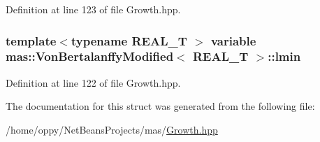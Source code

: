 Definition at line 123 of file Growth.\-hpp.

\hypertarget{structmas_1_1_von_bertalanffy_modified_a2845686ae982422d40b571cb19712cc9}{
\subsubsection[{lmin}]{\setlength{\rightskip}{0pt plus 5cm}template$<$typename R\-E\-A\-L\-\_\-\-T $>$ {\bf variable} {\bf mas\-::\-Von\-Bertalanffy\-Modified}$<$ R\-E\-A\-L\-\_\-\-T $>$\-::lmin}}\label{structmas_1_1_von_bertalanffy_modified_a2845686ae982422d40b571cb19712cc9}


Definition at line 122 of file Growth.\-hpp.



The documentation for this struct was generated from the following file\-:\begin{DoxyCompactItemize}
\item 
/home/oppy/\-Net\-Beans\-Projects/mas/\hyperlink{_growth_8hpp}{Growth.\-hpp}\end{DoxyCompactItemize}
